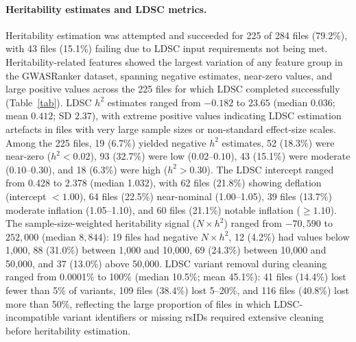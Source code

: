 \documentclass[11pt,a4paper]{article}
\begin{document}
\paragraph{Heritability estimates and LDSC metrics.}Heritability estimation was attempted and succeeded for 225 of 284 files (79.2\%), with 43 files (15.1\%) failing due to LDSC input requirements not being met. Heritability-related features showed the largest variation of any feature group in the GWASRanker dataset, spanning negative estimates, near-zero values, and large positive values across the 225 files for which LDSC completed successfully (Table~\ref{tab}). LDSC $h^2$ estimates ranged from $-0.182$ to $23.65$ (median $0.036$; mean $0.412$; SD $2.37$), with extreme positive values indicating LDSC estimation artefacts in files with very large sample sizes or non-standard effect-size scales. Among the 225 files, 19 (6.7\%) yielded negative $h^2$ estimates, 52 (18.3\%) were near-zero ($h^2 < 0.02$), 93 (32.7\%) were low ($0.02$--$0.10$), 43 (15.1\%) were moderate ($0.10$--$0.30$), and 18 (6.3\%) were high ($h^2 > 0.30$). The LDSC intercept ranged from 0.428 to 2.378 (median 1.032), with 62 files (21.8\%) showing deflation (intercept $< 1.00$), 64 files (22.5\%) near-nominal (1.00--1.05), 39 files (13.7\%) moderate inflation (1.05--1.10), and 60 files (21.1\%) notable inflation ($\geq 1.10$). The sample-size-weighted heritability signal ($N \times h^2$) ranged from $-70{,}590$ to $252{,}000$ (median $8{,}844$): 19 files had negative $N \times h^2$, 12 (4.2\%) had values below 1,000, 88 (31.0\%) between 1,000 and 10,000, 69 (24.3\%) between 10,000 and 50,000, and 37 (13.0\%) above 50,000. LDSC variant removal during cleaning ranged from 0.0001\% to 100\% (median 10.5\%; mean 45.1\%): 41 files (14.4\%) lost fewer than 5\% of variants, 109 files (38.4\%) lost 5--20\%, and 116 files (40.8\%) lost more than 50\%, reflecting the large proportion of files in which LDSC-incompatible variant identifiers or missing rsIDs required extensive cleaning before heritability estimation.
\end{document}
